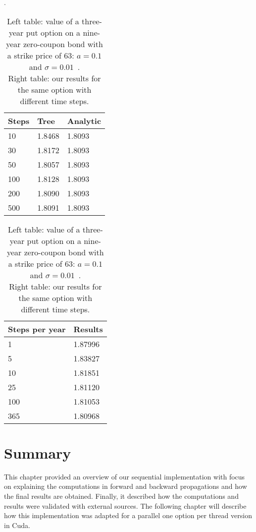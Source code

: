\begin{table}[h]
\centering
\caption{Left table: value of a three-year put option on a nine-year zero-coupon bond with a strike price of 63: $a = 0.1$ and $\sigma = 0.01$~\cite[pg. 707]{ofod}.\\Right table: our results for the same option with different time steps.}.
\label{table:book-results}
\begin{tabular}{|lll|}
\hline
Steps & Tree   & Analytic \\ \hline
10    & 1.8468 & 1.8093   \\
30    & 1.8172 & 1.8093   \\
50    & 1.8057 & 1.8093   \\
100   & 1.8128 & 1.8093   \\
200   & 1.8090 & 1.8093   \\
500   & 1.8091 & 1.8093   \\ \hline
\end{tabular}
\begin{tabular}{|ll|}
\hline
Steps per year & Results \\ \hline
1              & 1.87996 \\
5              & 1.83827 \\
10             & 1.81851 \\
25             & 1.81120 \\
100            & 1.81053 \\
365            & 1.80968 \\ \hline
\end{tabular}
\end{table}

\section{Summary}
This chapter provided an overview of our sequential implementation with focus on explaining  the computations in forward and backward propagations and how the final results are obtained. Finally, it described how the computations and results were validated with external sources. 
The following chapter will describe how this implementation was adapted for a parallel one option per thread version in Cuda.
